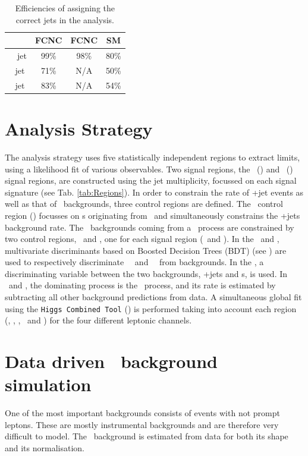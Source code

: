 \begin{table}[htbp]
	\centering
	\caption{Efficiencies of assigning the correct jets in the analysis.}
	\begin{tabular}{cccc}
		\toprule
		& FCNC \tZq  & FCNC \tZ & SM \tZq \\ 
		\midrule
		\SM\ \Pbottom\ jet & 99\% & 98\% & 80\%\\ 
		\Pcharm\ jet  & 71\% & N/A & 50\% \\  
		\Pup\ jet  & 83\% & N/A & 54\% \\ 
		\bottomrule
	\end{tabular} 
	\label{tab:matching2}
\end{table}


\section{Analysis Strategy}
\label{sec:selection}

The analysis strategy uses five statistically independent regions to extract limits, using a likelihood fit of various observables. Two signal regions, the \tZ\ (\STSR) and \tZq\ (\TTSR) signal regions, are constructed using the jet multiplicity,  focussed on each signal signature (see Tab. \ref{tab:Regions}).  In order to constrain the rate of \WZ+jet events as well as that of \NPL\ backgrounds, three control regions are defined. The \WZ\ control region (\WZCR) focusses on \NPL s originating from \DY\ and simultaneously constrains the \WZ+jets background rate. The \NPL\ backgrounds coming from a \ttbar\ process are constrained by two control regions, \TTCR\ and \STCR, one for each signal region (\TTSR\ and \STSR).  In the \STSR\ and \TTSR, multivariate discriminants based on Boosted Decision Trees (BDT) (see ) are used to respectively discriminate \FCNC\ \tZ\ and \FCNC\ \tZq\ from backgrounds. In the \WZCR, a  discriminating variable between the two backgrounds, \WZ+jets and \NPL s, is used. In \TTCR\ and \STCR, the dominating process is the \ttbar\ process, and its rate is estimated by subtracting all other background predictions from data. A simultaneous global fit using the \texttt{Higgs Combined Tool} () is performed taking into account each region (\STSR, \TTSR, \WZCR, \TTCR\ and \STCR) for the four different leptonic channels. 


\section{Data driven \NPL\ background simulation}
\label{sec:NPL}
 One of the most important backgrounds consists of events with not prompt leptons. These are mostly instrumental backgrounds and are therefore very difficult to model. The \NPL\ background is estimated from data for both its shape and its normalisation. 

